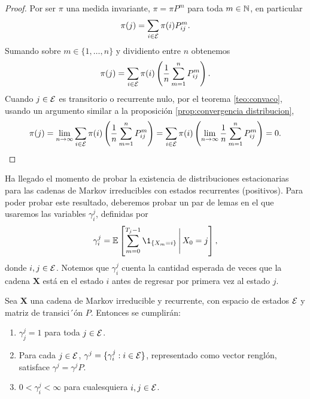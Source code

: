 \begin{proof}
    Por ser $\pi$ una medida invariante, $\pi = \pi P^m$ para toda $m \in \mathbb{N}$, en particular
    \[
        \pi(j) =  \sum_{i \in \mathcal{E}} \pi(i) P_{ij}^m.
    \]
    Sumando sobre $m \in \{1, \ldots, n\}$ y dividiento entre $n$ obtenemos 
    \[
        \pi(j) = \sum_{i \in \mathcal{E}} \pi(i) \left(\frac 1 n \sum_{m = 1}^n P_{ij}^m\right).
    \]
    Cuando $j \in \mathcal{E}$ es transitorio o recurrente nulo, por el teorema \ref{teo:convaco}, usando un argumento similar a la proposición \ref{prop:convergencia distribucion},
    \[
        \pi(j) = \lim_{n \to \infty} \sum_{i \in \mathcal{E}} \pi(i) \left(\frac 1 n \sum_{m = 1}^n P_{ij}^m\right) = \sum_{i \in \mathcal{E}} \pi(i) \left( \lim_{n \to \infty} \frac 1 n \sum_{m = 1}^n P_{ij}^m\right) = 0. \qedhere
    \]
\end{proof}

Ha llegado el momento de probar la existencia de distribuciones estacionarias para las cadenas de Markov irreducibles con estados recurrentes (positivos). Para poder probar este resultado, deberemos probar un par de lemas en el que usaremos las variables $\gamma_i^j$, definidas por
\[
    \gamma_i^j = \EE \left[\sum_{m = 0}^{T_j-1} \1_{\{X_m = i\}} \,\Bigg\vert\, X_0 = j \right],
\]
donde $i,j \in \mathcal{E}$. Notemos que $\gamma_i^j$ cuenta la cantidad esperada de veces que la cadena $\bm X$ está en el estado $i$ antes de regresar por primera vez al estado $j$.

\begin{lemma} \label{lem:invarianza gamma}
    Sea $\bm X$ una cadena de Markov irreducible y recurrente, con espacio de estados $\mathcal{E}$ y matriz de transici´ón $P$. Entonces se cumplirán:
    \begin{enumerate}
        \item $\gamma_j^j = 1$ para toda $j \in \mathcal{E}$.
        \item Para cada $j \in \mathcal{E}$, $\gamma^j = \{\gamma_i^j : i \in \mathcal{E}\}$, representado como  vector renglón, satisface $\gamma^j = \gamma^j P$.
        \item $0 < \gamma_i^j < \infty$ para cualesquiera $i, j \in \mathcal{E}$.
    \end{enumerate}
\end{lemma}

